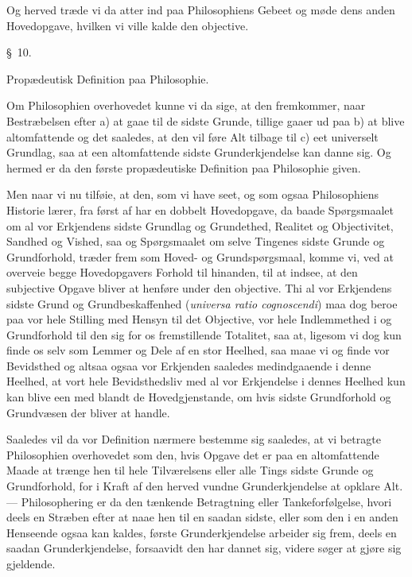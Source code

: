\documentclass[12pt,a4paper]{book}
\newcommand{\apage}[1]{\marginnote{\footnotesize\textit{[#1]}}}
\begin{document}
Og herved træde vi da atter ind paa Philosophiens Gebeet og møde dens anden
Hovedopgave, hvilken vi ville kalde den objective.

\begin{center}\large\S~10.\end{center}
\begin{center}Propædeutisk Definition paa Philosophie.\end{center}

Om Philosophien overhovedet kunne vi da sige, at den fremkommer, naar
Bestræbelsen efter a) at gaae til de sidste Grunde, tillige gaaer ud paa b) at
blive altomfattende og det saaledes, at den vil føre Alt tilbage til c) eet
universelt Grundlag, saa at een altomfattende sidste Grunderkjendelse kan danne
sig. Og hermed er da den første propædeutiske Definition paa Philosophie given.

Men naar vi nu tilføie, at den, som vi have seet, og som ogsaa Philosophiens
Historie lærer, fra først af har en dobbelt Hovedopgave, da baade Spørgsmaalet om
al vor Erkjendens sidste Grundlag og Grundethed, Realitet og Objectivitet, Sandhed
og Vished, saa og Spørgsmaalet om selve Tingenes sidste Grunde og Grundforhold,
træder frem som Hoved- og Grundspørgsmaal, komme vi, ved at overveie begge
Hovedopgavers Forhold til hinanden, til at indsee, at den subjective Opgave bliver
at henføre under den objective. Thi al vor Erkjendens sidste Grund og
Grundbeskaffenhed (\textit{universa ratio cognoscendi}) maa dog beroe paa vor hele
Stilling med Hensyn til det Objective, vor hele \apage{29}  Indlemmethed i og Grundforhold til
den sig for os fremstillende Totalitet, saa at, ligesom vi dog kun finde os selv
som Lemmer og Dele af en stor Heelhed, saa maae vi og finde vor Bevidsthed og
altsaa ogsaa vor Erkjenden saaledes medindgaaende i denne Heelhed, at vort hele
Bevidsthedsliv med al vor Erkjendelse i dennes Heelhed kun kan blive een med
blandt de Hovedgjenstande, om hvis sidste Grundforhold og Grundvæsen der bliver
at handle.

Saaledes vil da vor Definition nærmere bestemme sig saaledes, at vi betragte
Philosophien overhovedet som den, hvis Opgave det er paa en altomfattende Maade
at trænge hen til hele Tilværelsens eller alle Tings sidste Grunde og Grundforhold,
for i Kraft af den herved vundne Grunderkjendelse at opklare Alt. --- Philosophering
er da den tænkende Betragtning eller Tankeforfølgelse, hvori deels en Stræben efter
at naae hen til en saadan sidste, eller som den i en anden Henseende ogsaa kan
kaldes, første Grunderkjendelse arbeider sig frem, deels en saadan Grunderkjendelse,
forsaavidt den har dannet sig, videre søger at gjøre sig gjeldende.
\end{document}
